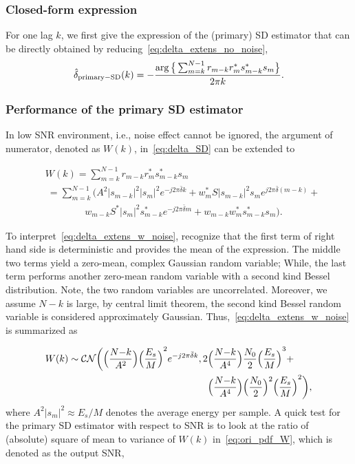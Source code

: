\subsubsection{Closed-form expression} 
For one lag $k$, we first give the expression of the (primary) SD estimator that can be directly obtained by reducing~\eqref{eq:delta_extens_no_noise},
\begin{equation}
    \label{eq:delta_SD}
    \hat{\delta}_{\text{primary}-\text{SD}}(k)=-\frac{\arg\big\{\sum_{m=k}^{N-1}r_{m-k}r_m^*s_{m-k}^*s_m\big\}}{2\pi k}.
\end{equation}

\subsubsection{Performance of the primary SD estimator}
In low SNR environment, i.e., noise effect cannot be ignored, the argument of numerator, denoted as $W(k)$, in~\eqref{eq:delta_SD} can be extended to 

\begin{equation}
  \label{eq:delta_extens_w_noise}
  \begin{aligned}
    &W(k)=\sum_{m=k}^{N-1}r_{m-k}r_m^*s_{m-k}^*s_m \\
    &~=\sum_{m=k}^{N-1} \Big( A^2|s_{m-k}|^2|s_m|^2e^{-j2\pi \bar{\delta} k} + w_m^* S|s_{m-k}|^2s_m e^{j2\pi \bar{\delta}(m-k)}+\\
    &\quad ~~~~~~~~~~~~~~ w_{m-k}S^*|s_m|^2s_{m-k}^* e^{-j2\pi \bar{\delta} m} + w_{m-k}w_m^*s_{m-k}^*s_m \Big) .
  \end{aligned}
\end{equation}

To interpret~\eqref{eq:delta_extens_w_noise}, recognize that the first term of right hand side is
deterministic and provides the mean of the expression. 
The middle two terms yield a zero-mean, complex Gaussian random variable; While,  
the last term performs another zero-mean random variable with a second kind Bessel distribution. 
Note, the two random variables are uncorrelated.
Moreover, we assume $N{-}k$ is large, by central limit theorem, 
the second kind Bessel random variable is considered approximately Gaussian.      
Thus,~\eqref{eq:delta_extens_w_noise} is summarized as

\begin{equation}
  \begin{aligned}
    \label{eq:ori_pdf_W}
    W(k) \sim \mathcal{CN}\bigg(\Big(
    \frac{N{-}k}{A^2}\Big){\Big(\frac{E_s}{M}\Big)}^2e^{-j2\pi \bar{\delta} k},
    2&\Big(\frac{N{-}k}{A^4}\Big)\frac{N_0}{2}{\Big(\frac{E_s}{M}\Big)}^3+ \\
    &\Big(\frac{N{-}k}{A^4}\Big)\Big(\frac{N_0}{2}\Big)^2{\Big(\frac{E_s}{M}\Big)}^2\bigg),
  \end{aligned}
\end{equation}
where $A^2|s_m|^2 {\approx} E_s/M$ denotes the average energy per
sample. A quick test for the primary SD estimator with respect to SNR is to look at the ratio of 
(absolute) square of mean to variance of $W(k)$ in~\eqref{eq:ori_pdf_W}, which is denoted as the output SNR,

